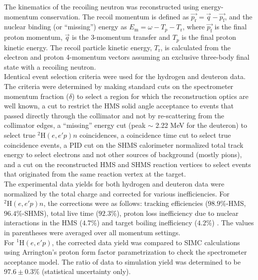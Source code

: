 \indent The kinematics of the recoiling neutron was reconstructed using energy-momentum conservation. The recoil momentum is defined as $\vec{p_{\mathrm{r}}} = \vec{q} - \vec{p_{\mathrm{f}}}$,
and the nuclear binding (or ``missing'') energy as $E_{\mathrm{m}} = \omega - T_{p} - T_{\mathrm{r}}$, where $\vec{p_{\mathrm{f}}}$ is the final proton momentum, $\vec{q}$ is the
3-momentum transfer and $T_{p}$ is the final proton kinetic energy. The recoil particle kinetic energy, $T_{\mathrm{r}}$, is calculated from the electron and proton
4-momentum vectors assuming an exclusive three-body final state with a recoiling neutron.\\
\indent Identical event selection criteria were used for the hydrogen and deuteron data. The criteria were determined by making standard cuts on the spectrometer momentum fraction ($\delta$) to select a region for which the reconstruction optics
are well known,  a cut to restrict the HMS solid angle acceptance to events that passed directly through the collimator and not by re-scattering from the collimator edges, a ``missing''
energy cut (peak $\sim$ 2.22 MeV for the deuteron) to select true $^{2}\mathrm{H}(e,e'p)n$ coincidences, a coincidence time cut to select true coincidence events, a PID cut on the
SHMS calorimeter normalized total track energy to select electrons and not other sources of background (mostly pions), and a cut on the reconstructed HMS and SHMS reaction vertices to select events that 
originated from the same reaction vertex at the target.\\
\indent The experimental data yields for both hydrogen and deuteron data were normalized by the total charge and corrected for various inefficiencies. For $^{2}\mathrm{H}(e,e'p)n$, the corrections
were as follows: tracking efficiencies ($98.9 \%$-HMS, $96.4 \%$-SHMS), total live time ($92.3 \%$), proton loss inefficiency due to nuclear interactions in the HMS ($4.7 \%$) \cite{cyero_phdthesis} and
target boiling inefficiency ($4.2 \%$) \cite{cyero_phdthesis}. The values in parentheses were averaged over all momentum settings. \\
\indent For $^{1}\mathrm{H}(e,e'p)$, the corrected data yield was compared to SIMC calculations using Arrington's proton form factor \DIFaddbegin {}\DIFaddend parametrization \cite{PhysRevC.69.022201} to check the spectrometer acceptance
model. The ratio of data to simulation yield was determined to be $97.6\pm0.3 \%$ (statistical uncertainty only).\\
